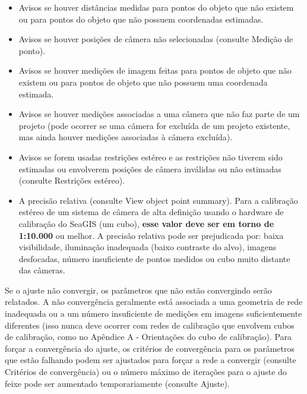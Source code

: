 \documentclass[
  12pt,
  letterpaper,
  DIV=11,
  numbers=noendperiod]{scrreprt}
\providecommand{\tightlist}{%
  \setlength{\itemsep}{0pt}\setlength{\parskip}{0pt}}
\begin{document}
\begin{itemize}
\tightlist
\item
  Avisos se houver distâncias medidas para pontos do objeto que não
  existem ou para pontos do objeto que não possuem coordenadas
  estimadas.
\end{itemize}

\begin{itemize}
\tightlist
\item
  Avisos se houver posições de câmera não selecionadas (consulte Medição
  de ponto).
\end{itemize}

\begin{itemize}
\tightlist
\item
  Avisos se houver medições de imagem feitas para pontos de objeto que
  não existem ou para pontos de objeto que não possuem uma coordenada
  estimada.
\end{itemize}

\begin{itemize}
\tightlist
\item
  Avisos se houver medições associadas a uma câmera que não faz parte de
  um projeto (pode ocorrer se uma câmera for excluída de um projeto
  existente, mas ainda houver medições associadas à câmera excluída).
\end{itemize}

\begin{itemize}
\tightlist
\item
  Avisos se forem usadas restrições estéreo e as restrições não tiverem
  sido estimadas ou envolverem posições de câmera inválidas ou não
  estimadas (consulte Restrições estéreo).
\end{itemize}

\begin{itemize}
\tightlist
\item
  A precisão relativa (consulte View object point summary). Para a
  calibração estéreo de um sistema de câmera de alta definição usando o
  hardware de calibração do SeaGIS (um cubo), \textbf{esse valor deve
  ser em torno de 1:10.000} ou melhor. A precisão relativa pode ser
  prejudicada por: baixa visibilidade, iluminação inadequada (baixo
  contraste do alvo), imagens desfocadas, número insuficiente de pontos
  medidos ou cubo muito distante das câmeras.
\end{itemize}

Se o ajuste não convergir, os parâmetros que não estão convergindo serão
relatados. A não convergência geralmente está associada a uma geometria
de rede inadequada ou a um número insuficiente de medições em imagens
suficientemente diferentes (isso nunca deve ocorrer com redes de
calibração que envolvem cubos de calibração, como no Apêndice A -
Orientações do cubo de calibração). Para forçar a convergência do
ajuste, os critérios de convergência para os parâmetros que estão
falhando podem ser ajustados para forçar a rede a convergir (consulte
Critérios de convergência) ou o número máximo de iterações para o ajuste
do feixe pode ser aumentado temporariamente (consulte Ajuste).
\end{document}
